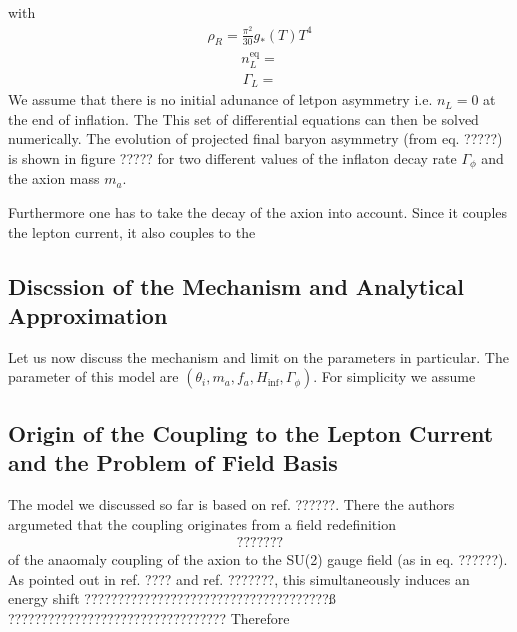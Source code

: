 \documentclass[13pt,a4paper,twoside,titlepage]{article}
\begin{document}
with
\begin{align}
    \rho_R = \frac{\pi^2}{30} g_{*}(T) T^4
\end{align}
\begin{align}
    n_L^\mathrm{eq} =
\end{align}
\begin{align}
    \Gamma_L =
\end{align}
We assume that there is no initial adunance of letpon asymmetry i.e. $n_L = 0$ at the end of inflation.
The
This set of differential equations can then be solved numerically. The evolution of projected final baryon asymmetry (from eq. ?????) is shown in figure ????? for two different values of the inflaton decay rate $\Gamma_\phi$ and the axion mass $m_a$.

Furthermore one has to take the decay of the axion into account.
Since it couples the lepton current, it also couples to the

\subsection{Discssion of the Mechanism and Analytical Approximation}
Let us now discuss the mechanism and limit on the parameters in particular.
The parameter of this model are $(\theta_i, m_a, f_a, H_\mathrm{inf}, \Gamma_\phi)$.
For simplicity we assume

\subsection{Origin of the Coupling to the Lepton Current and the Problem of Field Basis}
The model we discussed so far is based on ref. ??????.
There the authors argumeted that the coupling originates from a field redefinition
\begin{align}
    ???????
\end{align}
of the anaomaly coupling of the axion to the SU(2) gauge field (as in eq. ??????).
As pointed out in ref. ???? and ref. ???????, this simultaneously induces an energy shift
?????????????????????????????????????ß
?????????????????????????????????
Therefore
\end{document}
